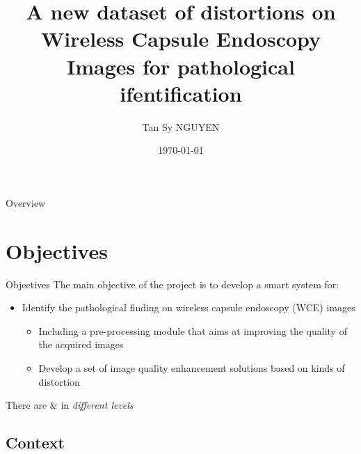 \documentclass{libs/ufc_format}
\title[A new dataset of distortions on WCE images]{\textbf{A new dataset of distortions on Wireless Capsule Endoscopy Images for pathological ifentification}}
\author{Tan Sy NGUYEN}
\institute[- USPN]{
    \normalsize{\email{tansy.nguyen@math.univ-paris13.fr}}
    \newline
    \department{LAGA, L2TI}
    \newline
    \uspn
}
\date{\today}
\begin{document}


\begin{frame}{}
    \maketitle
\end{frame}

\begin{frame}{Overview}
        \tableofcontents
\end{frame}

\section{Objectives}
\begin{frame}{Objectives}
    The main objective of the project is to develop a smart system for:
    \begin{itemize}
        \item Identify the pathological finding on wireless capsule endoscopy (WCE) images
        \begin{itemize}
            \item Including a pre-processing module that aims at improving the quality of the acquired images
            \item Develop a set of image quality enhancement solutions based on kinds of distortion
        \end{itemize}
        
        
    \end{itemize}

    \vspace{0.2cm}

     There are  $\&$ in \emph{different levels}
\end{frame}

\subsection{Context}
\end{document}
